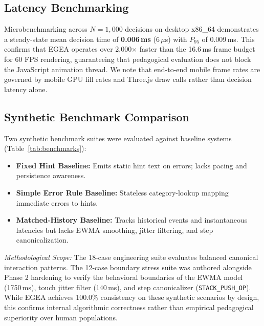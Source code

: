 \documentclass[conference]{IEEEtran}
\begin{document}
\subsection{Latency Benchmarking}
Microbenchmarking across $N = 1,000$ decisions on desktop x86\_64 demonstrates a steady-state mean decision time of \textbf{0.006\,ms} ($6\,\mu$s) with $P_{95}$ of 0.009\,ms. This confirms that EGEA operates over 2,000$\times$ faster than the 16.6\,ms frame budget for 60 FPS rendering, guaranteeing that pedagogical evaluation does not block the JavaScript animation thread. We note that end-to-end mobile frame rates are governed by mobile GPU fill rates and Three.js draw calls rather than decision latency alone.

\subsection{Synthetic Benchmark Comparison}
Two synthetic benchmark suites were evaluated against baseline systems (Table~\ref{tab:benchmarks}):
\begin{itemize}
    \item \textbf{Fixed Hint Baseline:} Emits static hint text on errors; lacks pacing and persistence awareness.
    \item \textbf{Simple Error Rule Baseline:} Stateless category-lookup mapping immediate errors to hints.
    \item \textbf{Matched-History Baseline:} Tracks historical events and instantaneous latencies but lacks EWMA smoothing, jitter filtering, and step canonicalization.
\end{itemize}

\textit{Methodological Scope:} The 18-case engineering suite evaluates balanced canonical interaction patterns. The 12-case boundary stress suite was authored alongside Phase 2 hardening to verify the behavioral boundaries of the EWMA model (1750\,ms), touch jitter filter (140\,ms), and step canonicalizer (\texttt{STACK\_PUSH\_OP}). While EGEA achieves 100.0\% consistency on these synthetic scenarios by design, this confirms internal algorithmic correctness rather than empirical pedagogical superiority over human populations.
\end{document}
